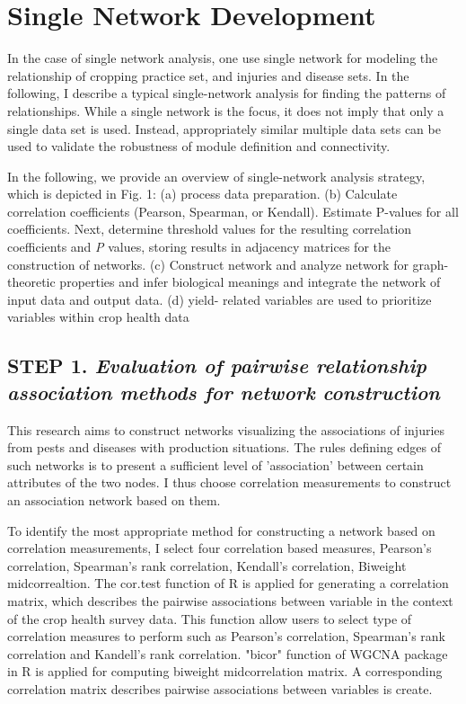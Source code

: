 \section*{Single Network Development}
In the case of single network analysis, one use single network for modeling the relationship of cropping practice set, and injuries and disease sets. In the following, I describe a typical single-network analysis for finding the patterns of relationships.
While a single network is the focus, it does not imply that only a single data set is used. Instead, appropriately similar multiple data sets can be used to validate the robustness of module definition and connectivity.

In the following, we provide an overview of single-network analysis strategy, which is depicted in Fig. 1: (a) process data preparation. (b) Calculate correlation coefficients (Pearson, Spearman, or Kendall). Estimate P-values for all coefficients. Next, determine threshold values for the resulting correlation coefficients and \textit{P} values, storing results in adjacency matrices for the construction of networks. (c) Construct network and analyze network for graph-theoretic properties and infer biological meanings and integrate the network of input data and output data. (d) yield- related variables are used to prioritize variables within crop health data


\subsection*{\textbf{STEP 1. }\textit{Evaluation of pairwise relationship association methods for network construction}}


This research aims to construct networks visualizing the associations of injuries from pests and diseases with production situations. The rules defining edges of such networks is to present a sufficient level of 'association' between certain attributes of the two nodes. I thus choose correlation measurements to construct an association network based on them.

To identify the most appropriate method for constructing a network based on correlation measurements, I select four correlation based measures, Pearson's correlation, Spearman's rank correlation, Kendall's correlation, Biweight midcorrealtion. The cor.test function of R  is applied for generating a correlation matrix, which describes the pairwise associations between variable in the context of the crop health survey data. This function allow users to select type of correlation measures to perform such as Pearson's correlation, Spearman's rank correlation and Kandell's rank correlation. "bicor" function of WGCNA package  in R is applied for computing biweight midcorrelation matrix. A corresponding correlation matrix describes pairwise associations between variables is create. %


